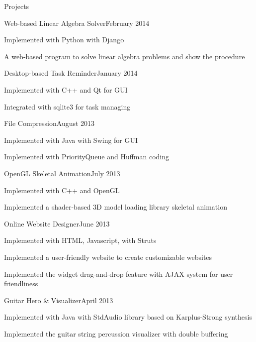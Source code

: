 \documentclass{resume} %
\begin{document}
\begin{rSection}{Projects}
\begin{rSubsection}{Web-based Linear Algebra Solver}{February 2014}{}{}
\item Implemented with Python with Django
\item A web-based program to solve linear algebra problems and show the procedure
\end{rSubsection}

\begin{rSubsection}{Desktop-based Task Reminder}{January 2014}{}{}
\item Implemented with C++ and Qt for GUI
\item Integrated with sqlite3 for task managing
\end{rSubsection}

\begin{rSubsection}{File Compression}{August 2013}{}{}
\item Implemented with Java with Swing for GUI
\item Implemented with PriorityQueue and Huffman coding
\end{rSubsection}


\begin{rSubsection}{OpenGL Skeletal Animation}{July 2013}{}{}
\item Implemented with C++ and OpenGL
\item Implemented a shader-based 3D model loading library skeletal animation
\end{rSubsection}


\begin{rSubsection}{Online Website Designer}{June 2013}{}{}
\item Implemented with HTML, Javascript, with Struts
\item Implemented a user-friendly website to create customizable websites
\item Implemented the widget drag-and-drop feature with AJAX system for user friendliness
\end{rSubsection}


\begin{rSubsection}{Guitar Hero \& Visualizer}{April 2013}{}{}
\item Implemented with Java with StdAudio library based on Karplus-Strong synthesis
\item Implemented the guitar string percussion visualizer with double buffering
\end{rSubsection}


\end{rSection}
\end{document}
